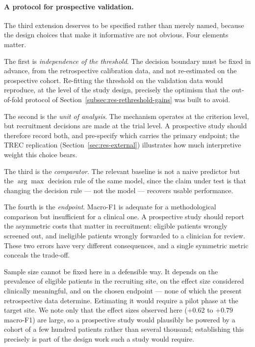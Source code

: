 \paragraph{A protocol for prospective validation.} The third extension 
deserves to be specified rather than merely named, because the design 
choices that make it informative are not obvious. Four elements matter.

The first is \emph{independence of the threshold}. The decision boundary 
must be fixed in advance, from the retrospective calibration data, and 
not re-estimated on the prospective cohort. Re-fitting the threshold on 
the validation data would reproduce, at the level of the study design, 
precisely the optimism that the out-of-fold protocol of 
Section~\ref{subsec:res-rethreshold-gains} was built to avoid.

The second is the \emph{unit of analysis}. The mechanism operates at the 
criterion level, but recruitment decisions are made at the trial level. 
A prospective study should therefore record both, and pre-specify which 
carries the primary endpoint; the TREC replication 
(Section~\ref{sec:res-external}) illustrates how much interpretive weight 
this choice bears.

The third is the \emph{comparator}. The relevant baseline is not a naive 
predictor but the $\arg\max$ decision rule of the same model, since the 
claim under test is that changing the decision rule --- not the model --- 
recovers usable performance.

The fourth is the \emph{endpoint}. Macro-F1 is adequate for a 
methodological comparison but insufficient for a clinical one. A 
prospective study should report the asymmetric costs that matter in 
recruitment: eligible patients wrongly screened out, and ineligible 
patients wrongly forwarded to a clinician for review. These two errors 
have very different consequences, and a single symmetric metric conceals 
the trade-off.

Sample size cannot be fixed here in a defensible way. It depends on the 
prevalence of eligible patients in the recruiting site, on the effect 
size considered clinically meaningful, and on the chosen endpoint --- 
none of which the present retrospective data determine. Estimating it 
would require a pilot phase at the target site. We note only that the 
effect sizes observed here ($+0.62$ to $+0.79$ macro-F1) are large, so a 
prospective study would plausibly be powered by a cohort of a few 
hundred patients rather than several thousand; establishing this 
precisely is part of the design work such a study would require.

